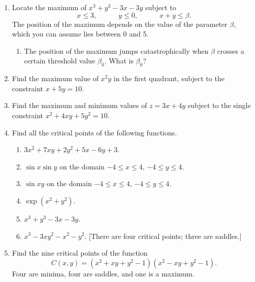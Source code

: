\begin{enumerate}
  \begin{enumerate}
  \item The position of the minimum jumps catastrophically when $\alpha$
passes through a certain value.  At what value of $\alpha$ does this
happen, and what jump occurs in the minimum?


\end{enumerate}
\item Locate the maximum of $x^3 + y^3 - 3x - 3y$ subject to
        \[
x \leq 3, \qquad \quad y \leq 0, \qquad \quad x + y \leq \beta.
\] 
The position of the maximum depends on the value of the parameter
$\beta$, which you can assume lies between 0 and 5.

  \begin{enumerate}
  \item The position of the maximum jumps catastrophically when $\beta$
crosses a certain threshold value $\beta_0$.  What is $\beta_0$?


\end{enumerate}
\item Find the maximum value of $x^2 y$ in the first quadrant, subject
to the constraint $x + 5 y = 10$.


\item Find the maximum and minimum values of $z = 3x + 4 y$ subject to
the single constraint $x^2 + 4xy + 5y^2 = 10$.


\item Find all the critical points of the following functions.

  \begin{enumerate}
  \item $3 x^2 + 7xy + 2 y^2 + 5x - 6 y + 3$.

  \item $\sin{x} \sin{y}$ \quad on the domain $-4 \leq x \leq 4$, $-4
\leq y \leq 4$.

  \item $\sin{xy}$ \quad on the domain $-4 \leq x \leq 4$, $-4 \leq y
\leq 4$.

  \item $\exp(x^2 + y^2)$.

  \item $x^3 + y^3 - 3x - 3 y$.

  \item $x^3 - 3x y^2 - x^2 - y^2$.  [There are four critical points;
  three are saddles.]


\end{enumerate}
\item Find the nine critical points of the function
        \[
C(x, y) = (x^2 + xy + y^2 -1)(x^2 - xy + y^2 - 1).
\]
Four are minima, four are saddles, and one is a maximum.


\end{enumerate}
